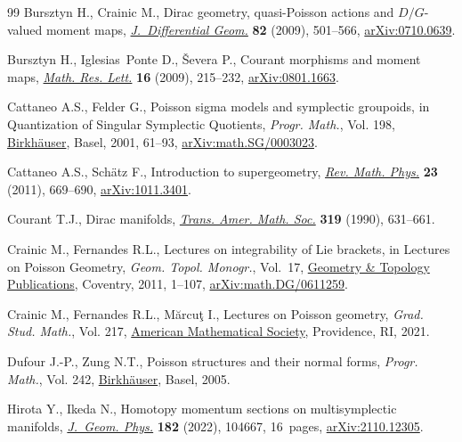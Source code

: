 \begin{thebibliography}{99}
Bursztyn H., Crainic M., Dirac geometry, quasi-{P}oisson actions and
 {$D/G$}-valued moment maps, \href{https://doi.org/10.4310/jdg/1251122545}{\textit{J.~Differential Geom.}} \textbf{82}
 (2009), 501--566, \href{https://arxiv.org/abs/0710.0639}{arXiv:0710.0639}.

Bursztyn H., Iglesias~Ponte D., \v{S}evera P., Courant morphisms and moment
 maps, \href{https://doi.org/10.4310/MRL.2009.v16.n2.a2}{\textit{Math. Res. Lett.}} \textbf{16} (2009), 215--232,
 \href{https://arxiv.org/abs/0801.1663}{arXiv:0801.1663}.

Cattaneo A.S., Felder G., Poisson sigma models and symplectic groupoids, in
 Quantization of {S}ingular {S}ymplectic {Q}uotients, \textit{Progr. Math.},
 Vol. 198, \href{https://doi.org/10.1007/978-3-0348-8364-1_4}{Birkh\"auser}, Basel, 2001, 61--93, \href{https://arxiv.org/abs/math.SG/0003023}{arXiv:math.SG/0003023}.

Cattaneo A.S., Sch\"atz F., Introduction to supergeometry, \href{https://doi.org/10.1142/S0129055X11004400}{\textit{Rev. Math.
 Phys.}} \textbf{23} (2011), 669--690, \href{https://arxiv.org/abs/1011.3401}{arXiv:1011.3401}.

Courant T.J., Dirac manifolds, \href{https://doi.org/10.2307/2001258}{\textit{Trans. Amer. Math. Soc.}} \textbf{319}
 (1990), 631--661.

Crainic M., Fernandes R.L., Lectures on integrability of {L}ie brackets, in
 Lectures on {P}oisson {G}eometry, \textit{Geom. Topol. Monogr.}, Vol.~17,
 \href{https://doi.org/10.2140/gt}{Geometry \& Topology Publications}, Coventry, 2011, 1--107,
 \href{https://arxiv.org/abs/math.DG/0611259}{arXiv:math.DG/0611259}.

Crainic M., Fernandes R.L., M\u{a}rcu\c{t} I., Lectures on {P}oisson geometry,
 \textit{Grad. Stud. Math.}, Vol. 217, \href{https://doi.org/10.1090/gsm/217}{American Mathematical Society},
 Providence, RI, 2021.

Dufour J.-P., Zung N.T., Poisson structures and their normal forms,
 \textit{Progr. Math.}, Vol. 242, \href{https://doi.org/10.1007/3-7643-7335-0}{Birkh\"auser}, Basel, 2005.

Hirota Y., Ikeda N., Homotopy momentum sections on multisymplectic manifolds,
 \href{https://doi.org/10.1016/j.geomphys.2022.104667}{\textit{J.~Geom. Phys.}} \textbf{182} (2022), 104667, 16~pages,
 \href{https://arxiv.org/abs/2110.12305}{arXiv:2110.12305}.


\end{thebibliography}
